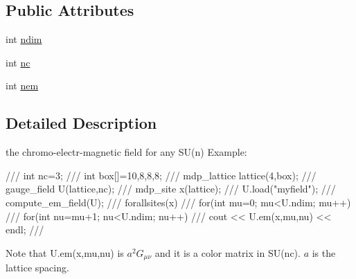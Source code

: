 \subsection*{Public Attributes}
\begin{DoxyCompactItemize}
\item 
int \hyperlink{classem__field_ad35fcd68bba9a301d34ceabc76f08226}{ndim}
\item 
int \hyperlink{classem__field_ab6fc146b5a94cf5961a133e55f832cd4}{nc}
\item 
int \hyperlink{classem__field_ab0049c2b2edc267a93c9299aecede037}{nem}
\end{DoxyCompactItemize}


\subsection{Detailed Description}
the chromo-\/electr-\/magnetic field for any SU(n) Example: \begin{DoxyVerb}
///    int nc=3; 
///    int box[]={10,8,8,8};
///    mdp_lattice lattice(4,box);
///    gauge_field U(lattice,nc);
///    mdp_site x(lattice);
///    U.load("myfield");
///    compute_em_field(U);
///    forallsites(x)
///      for(int mu=0; mu<U.ndim; mu++)
///        for(int nu=mu+1; nu<U.ndim; nu++)
///          cout << U.em(x,mu,nu) << endl;
/// \end{DoxyVerb}
 Note that U.em(x,mu,nu) is $ a^2 G_{\mu\nu} $ and it is a color matrix in SU(nc). $a$ is the lattice spacing. 

